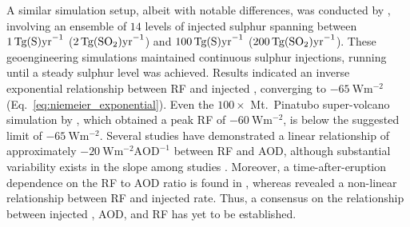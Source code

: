 \documentclass[draft]{agujournal2019}
\begin{document}
  A similar simulation setup, albeit with notable differences, was conducted by
  , involving an ensemble of \(14\) levels of injected sulphur
  spanning between \(\SI{1}{\tera\gram(\ce{S})\mathrm{yr}^{-1}}\)
  (\(\SI{2}{\tera\gram(\ce{SO2})\mathrm{yr}^{-1}}\)) and
  \(\SI{100}{\tera\gram(\ce{S})\mathrm{yr}^{-1}}\)
  (\(\SI{200}{\tera\gram(\ce{SO2})\mathrm{yr}^{-1}}\)). These geoengineering simulations
  maintained continuous sulphur injections, running until a steady sulphur level was
  achieved. Results indicated an inverse exponential relationship between RF and
  injected  , converging to
  \(\SI{-65}{\watt\metre^{-2}}\) (Eq.~\ref{eq:niemeier_exponential}). Even the
  \(100\times\) Mt.\ Pinatubo super-volcano simulation by , which
  obtained a peak RF of \(\SI{-60}{\watt\metre^{-2}}\), is below the suggested limit of
  \(\SI{-65}{\watt\metre^{-2}}\).  Several studies have demonstrated a linear relationship of approximately
  \(-\SI{20}{\watt\metre^{-2}\mathrm{AOD}^{-1}}\) between RF and AOD, although
  substantial variability exists in the slope among studies
  \cite{mills2017,hansen2005,gregory2016,marshall2020,pitari2016b}. Moreover, a
  time-after-eruption dependence on the RF to AOD ratio is found in
  , whereas  revealed a non-linear relationship
  between RF and injected  rate. Thus, a consensus on the relationship between
  injected , AOD, and RF has yet to be established.
\end{document}
